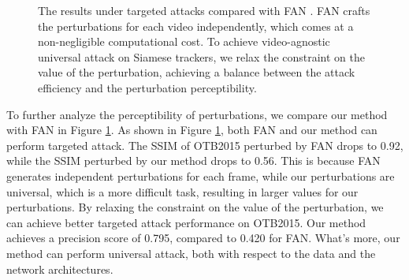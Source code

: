 \documentclass[journal]{IEEEtran}
\begin{document}
\begin{figure}[t]
  \centering
  \caption{The results under targeted attacks compared with FAN \cite{FAN}.  FAN crafts the perturbations for each video independently, which comes at a non-negligible computational cost. To achieve video-agnostic universal attack on Siamese trackers, we relax the constraint on the value of the perturbation, achieving a balance between the attack efficiency and the perturbation perceptibility.}
  \label{fig:vis_fan}
\end{figure}

To further analyze the perceptibility of perturbations, we compare our method with FAN in Figure \ref{fig:vis_fan}.
As shown in Figure \ref{fig:vis_fan}, both FAN \cite{FAN} and our method can perform targeted attack. 
The SSIM of OTB2015 perturbed by FAN drops to 0.92, while the SSIM perturbed by our method drops to 0.56.
This is because FAN generates independent perturbations for each frame, while our perturbations are universal, which is a more difficult task, resulting in larger values for our perturbations.
By relaxing the constraint on the value of the perturbation, we can achieve better targeted attack performance on OTB2015.
Our method achieves a precision score of 0.795, compared to 0.420 for FAN.
What's more, our method can perform universal attack, both with respect to the data and the network architectures.
\end{document}
